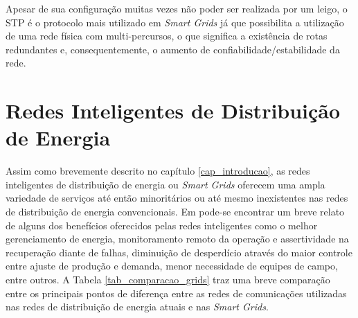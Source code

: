Apesar de sua configuração muitas vezes não poder ser realizada por um leigo, o STP é o protocolo mais utilizado em \emph{Smart Grids} já que possibilita a utilização de uma rede física com multi-percursos, o que significa a existência de rotas redundantes e, consequentemente, o aumento de confiabilidade/estabilidade da rede.

\section{Redes Inteligentes de Distribuição de Energia}
Assim como brevemente descrito no capítulo \ref{cap_introducao}, as redes inteligentes de distribuição de energia ou \emph{Smart Grids} oferecem uma ampla variedade de serviços até então minoritários ou até mesmo inexistentes nas redes de distribuição de energia convencionais. Em \cite{Art-Ma2013} pode-se encontrar um breve relato de alguns dos benefícios oferecidos pelas redes inteligentes como o melhor gerenciamento de energia, monitoramento remoto da operação e assertividade na recuperação diante de falhas, diminuição de desperdício através do maior controle entre ajuste de produção e demanda, menor necessidade de equipes de campo, entre outros. A Tabela \ref{tab_comparacao_grids} traz uma breve comparação entre os principais pontos de diferença entre as redes de comunicações utilizadas nas redes de distribuição de energia atuais e nas \emph{Smart Grids}.

